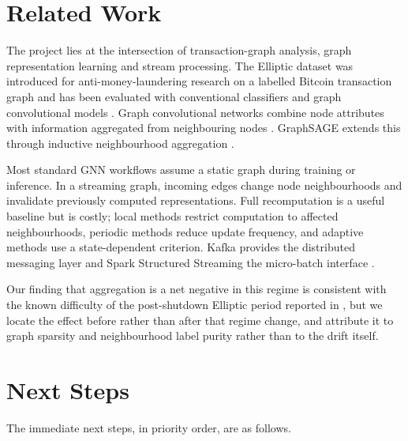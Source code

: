 \documentclass[conference]{IEEEtran}
\begin{document}
\section{Related Work}

The project lies at the intersection of transaction-graph analysis, graph
representation learning and stream processing. The Elliptic dataset was
introduced for anti-money-laundering research on a labelled Bitcoin transaction
graph and has been evaluated with conventional classifiers and graph
convolutional models \cite{weber2019}. Graph convolutional networks combine
node attributes with information aggregated from neighbouring nodes
\cite{kipf2017}. GraphSAGE extends this through inductive neighbourhood
aggregation \cite{hamilton2017}.

Most standard GNN workflows assume a static graph during training or inference.
In a streaming graph, incoming edges change node neighbourhoods and invalidate
previously computed representations. Full recomputation is a useful baseline
but is costly; local methods restrict computation to affected neighbourhoods,
periodic methods reduce update frequency, and adaptive methods use a
state-dependent criterion. Kafka provides the distributed messaging layer
\cite{kreps2011} and Spark Structured Streaming the micro-batch interface
\cite{armbrust2018}.

Our finding that aggregation is a net negative in this regime is consistent
with the known difficulty of the post-shutdown Elliptic period reported in
\cite{weber2019}, but we locate the effect before rather than after that
regime change, and attribute it to graph sparsity and neighbourhood label
purity rather than to the drift itself.

\section{Next Steps}

The immediate next steps, in priority order, are as follows.
\end{document}
